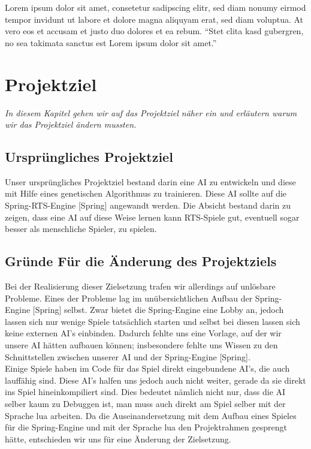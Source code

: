\documentclass[
	12pt,
	a4paper,
	BCOR10mm,
	DIV14,
	headsepline,
	usegeometry,
]{scrreprt}
\begin{document}
Lorem ipsum dolor sit amet, consetetur sadipscing elitr, sed diam nonumy eirmod tempor invidunt ut labore et dolore magna aliquyam erat, sed diam voluptua.
At vero eos et accusam et justo duo dolores et ea rebum.
“Stet clita kasd gubergren, no sea takimata sanctus est Lorem ipsum dolor sit amet.”~\cite{Quelle2012}

\medskip


\chapter{Projektziel}
\label{Projektziel}

\textit{%
In diesem Kapitel gehen wir auf das Projektziel näher ein und erläutern warum wir das Projektziel ändern mussten.
}

\bigskip

\section{Ursprüngliches Projektziel}

Unser ursprüngliches Projektziel bestand darin eine AI zu entwickeln und diese mit Hilfe eines genetischen Algorithmus zu trainieren. Diese AI sollte auf die Spring-RTS-Engine [Spring] angewandt werden. Die Absicht bestand darin zu zeigen, dass eine AI auf diese Weise lernen kann RTS-Spiele gut, eventuell sogar besser als menschliche Spieler, zu spielen.\\

\section{Gründe Für die Änderung des Projektziels}
Bei der Realisierung dieser Zielsetzung trafen wir allerdings auf unlösbare Probleme. Eines der Probleme lag im unübersichtlichen Aufbau der Spring-Engine [Spring] selbst. Zwar bietet die Spring-Engine eine Lobby an, jedoch lassen sich nur wenige Spiele tatsächlich starten und selbst bei diesen lassen sich keine externen AI's einbinden. Dadurch fehlte uns eine Vorlage, auf der wir unsere AI hätten aufbauen können; insbesondere fehlte uns Wissen zu den Schnittstellen zwischen unserer AI und der Spring-Engine [Spring]. \\
Einige Spiele haben im Code für das Spiel direkt eingebundene AI's, die auch lauffähig sind. Diese AI's halfen uns jedoch auch nicht weiter, gerade da sie direkt ins Spiel hineinkompiliert sind. Dies bedeutet nämlich nicht nur, dass die AI selber kaum zu Debuggen ist, man muss auch direkt am Spiel selber mit der Sprache lua arbeiten. Da die Auseinandersetzung mit dem Aufbau eines Spieles für die Spring-Engine und mit der Sprache lua den Projektrahmen gesprengt hätte, entschieden wir uns für eine Änderung der Zielsetzung.
\end{document}
